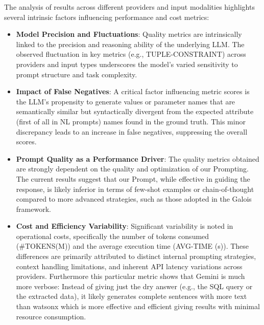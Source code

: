 The analysis of results across different providers and input modalities highlights several intrinsic factors influencing performance and cost metrics:

\begin{itemize}[leftmargin=*, label=$\bullet$]
    \item \textbf{Model Precision and Fluctuations}: Quality metrics are intrinsically linked to the precision and reasoning ability of the underlying LLM. The observed fluctuation in key metrics (e.g., TUPLE-CONSTRAINT) across providers and input types underscores the model's varied sensitivity to prompt structure and task complexity.
    
    \item \textbf{Impact of False Negatives}: A critical factor influencing metric scores is the LLM's propensity to generate values or parameter names that are semantically similar but syntactically divergent from the expected attribute (first of all in NL prompts) names found in the ground truth. This minor discrepancy leads to an increase in false negatives, suppressing the overall scores.
    
    \item \textbf{Prompt Quality as a Performance Driver}: The quality metrics obtained are strongly dependent on the quality and optimization of our Prompting. The current results suggest that our Prompt, while effective in guiding the response, is likely inferior in terms of few-shot examples or chain-of-thought compared to more advanced strategies, such as those adopted in the Galois framework.
    
    \item \textbf{Cost and Efficiency Variability}: Significant variability is noted in operational costs, specifically the number of tokens consumed (\#TOKENS(M)) and the average execution time (AVG-TIME (s)). These differences are primarily attributed to distinct internal prompting strategies, context handling limitations, and inherent API latency variations across providers.
    Furthermore this particular metric shows that Gemini is much more verbose: Instead of giving just the dry answer (e.g., the SQL query or the extracted data), it likely generates complete sentences with more text than watsonx which is more effective and efficient giving results with minimal resource consumption.
\end{itemize}